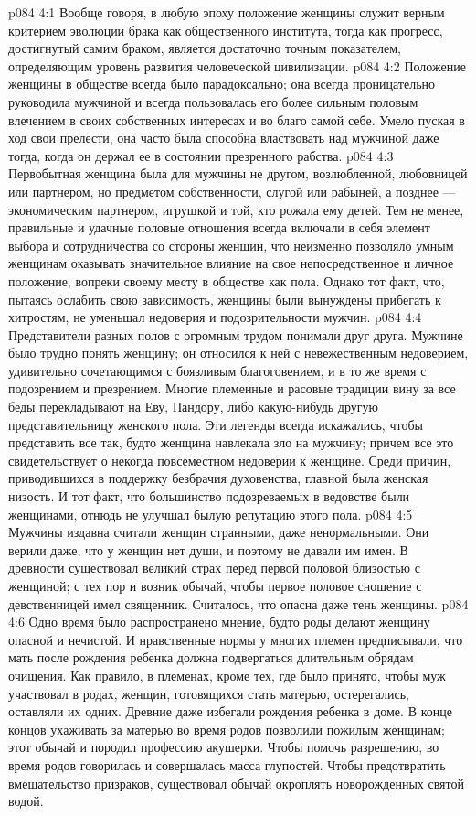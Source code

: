 \vs p084 4:1 Вообще говоря, в любую эпоху положение женщины служит верным критерием эволюции брака как общественного института, тогда как прогресс, достигнутый самим браком, является достаточно точным показателем, определяющим уровень развития человеческой цивилизации.
\vs p084 4:2 \pc Положение женщины в обществе всегда было парадоксально; она всегда проницательно руководила мужчиной и всегда пользовалась его более сильным половым влечением в своих собственных интересах и во благо самой себе. Умело пуская в ход свои прелести, она часто была способна властвовать над мужчиной даже тогда, когда он держал ее в состоянии презренного рабства.
\vs p084 4:3 Первобытная женщина была для мужчины не другом, возлюбленной, любовницей или партнером, но предметом собственности, слугой или рабыней, а позднее --- экономическим партнером, игрушкой и той, кто рожала ему детей. Тем не менее, правильные и удачные половые отношения всегда включали в себя элемент выбора и сотрудничества со стороны женщин, что неизменно позволяло умным женщинам оказывать значительное влияние на свое непосредственное и личное положение, вопреки своему месту в обществе как пола. Однако тот факт, что, пытаясь ослабить свою зависимость, женщины были вынуждены прибегать к хитростям, не уменьшал недоверия и подозрительности мужчин.
\vs p084 4:4 \pc Представители разных полов с огромным трудом понимали друг друга. Мужчине было трудно понять женщину; он относился к ней с невежественным недоверием, удивительно сочетающимся с боязливым благоговением, и в то же время с подозрением и презрением. Многие племенные и расовые традиции вину за все беды перекладывают на Еву, Пандору, либо какую\hyp{}нибудь другую представительницу женского пола. Эти легенды всегда искажались, чтобы представить все так, будто женщина навлекала зло на мужчину; причем все это свидетельствует о некогда повсеместном недоверии к женщине. Среди причин, приводившихся в поддержку безбрачия духовенства, главной была женская низость. И тот факт, что большинство подозреваемых в ведовстве были женщинами, отнюдь не улучшал былую репутацию этого пола.
\vs p084 4:5 Мужчины издавна считали женщин странными, даже ненормальными. Они верили даже, что у женщин нет души, и поэтому не давали им имен. В древности существовал великий страх перед первой половой близостью с женщиной; с тех пор и возник обычай, чтобы первое половое сношение с девственницей имел священник. Считалось, что опасна даже тень женщины.
\vs p084 4:6 Одно время было распространено мнение, будто роды делают женщину опасной и нечистой. И нравственные нормы у многих племен предписывали, что мать после рождения ребенка должна подвергаться длительным обрядам очищения. Как правило, в племенах, кроме тех, где было принято, чтобы муж участвовал в родах, женщин, готовящихся стать матерью, остерегались, оставляли их одних. Древние даже избегали рождения ребенка в доме. В конце концов ухаживать за матерью во время родов позволили пожилым женщинам; этот обычай и породил профессию акушерки. Чтобы помочь разрешению, во время родов говорилась и совершалась масса глупостей. Чтобы предотвратить вмешательство призраков, существовал обычай окроплять новорожденных святой водой.

